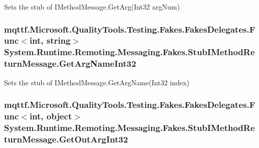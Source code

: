 Sets the stub of I\-Method\-Message.\-Get\-Arg(\-Int32 arg\-Num)

\hypertarget{class_system_1_1_runtime_1_1_remoting_1_1_messaging_1_1_fakes_1_1_stub_i_method_return_message_abb77c4a5cc1ed3a63c49b6d9d3bccb2c}{
\subsubsection[{Get\-Arg\-Name\-Int32}]{\setlength{\rightskip}{0pt plus 5cm}mqttf.\-Microsoft.\-Quality\-Tools.\-Testing.\-Fakes.\-Fakes\-Delegates.\-Func$<$int, string$>$ System.\-Runtime.\-Remoting.\-Messaging.\-Fakes.\-Stub\-I\-Method\-Return\-Message.\-Get\-Arg\-Name\-Int32}}\label{class_system_1_1_runtime_1_1_remoting_1_1_messaging_1_1_fakes_1_1_stub_i_method_return_message_abb77c4a5cc1ed3a63c49b6d9d3bccb2c}


Sets the stub of I\-Method\-Message.\-Get\-Arg\-Name(\-Int32 index)

\hypertarget{class_system_1_1_runtime_1_1_remoting_1_1_messaging_1_1_fakes_1_1_stub_i_method_return_message_a82dde4338a43d914e9fa97dede6151ba}{
\subsubsection[{Get\-Out\-Arg\-Int32}]{\setlength{\rightskip}{0pt plus 5cm}mqttf.\-Microsoft.\-Quality\-Tools.\-Testing.\-Fakes.\-Fakes\-Delegates.\-Func$<$int, object$>$ System.\-Runtime.\-Remoting.\-Messaging.\-Fakes.\-Stub\-I\-Method\-Return\-Message.\-Get\-Out\-Arg\-Int32}}\label{class_system_1_1_runtime_1_1_remoting_1_1_messaging_1_1_fakes_1_1_stub_i_method_return_message_a82dde4338a43d914e9fa97dede6151ba}


